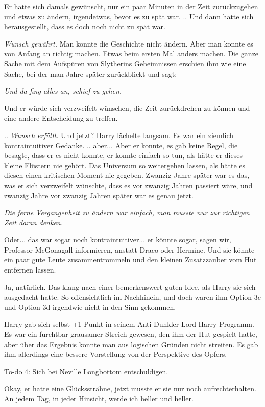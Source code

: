 Er hatte sich damals gewünscht, nur ein paar Minuten in der Zeit zurückzugehen
und etwas zu ändern, irgendetwas, bevor es zu spät war. .. Und dann hatte sich
herausgestellt, dass es doch noch nicht zu spät war.

\emph{Wunsch gewährt.} Man konnte die Geschichte nicht ändern. Aber man konnte
es von Anfang an richtig machen. Etwas beim ersten Mal anders machen. Die ganze
Sache mit dem Aufspüren von Slytherins Geheimnissen erschien ihm wie eine Sache,
bei der man Jahre später zurückblickt und sagt:

\emph{Und da fing alles an, schief zu gehen.}

Und er würde sich verzweifelt wünschen, die Zeit zurückdrehen zu können und eine
andere Entscheidung zu treffen.

.. \emph{Wunsch erfüllt.} Und jetzt? Harry lächelte langsam. Es war ein ziemlich
kontraintuitiver Gedanke. .. aber... Aber er konnte, es gab keine Regel, die
besagte, dass er es nicht konnte, er konnte einfach so tun, als hätte er dieses
kleine Flüstern nie gehört. Das Universum so weitergehen lassen, als hätte es
diesen einen kritischen Moment nie gegeben. Zwanzig Jahre später war es das, was
er sich verzweifelt wünschte, dass es vor zwanzig Jahren passiert wäre, und
zwanzig Jahre vor zwanzig Jahren später war es genau jetzt.

\emph{Die ferne Vergangenheit zu ändern war einfach, man musste nur zur
richtigen Zeit daran denken. }

Oder... das war sogar noch kontraintuitiver... er könnte sogar, sagen wir,
Professor McGonagall informieren, anstatt Draco oder Hermine. Und sie könnte ein
paar gute Leute zusammentrommeln und den kleinen Zusatzzauber vom Hut entfernen
lassen.

Ja, natürlich. Das klang nach einer bemerkenswert guten Idee, als Harry sie sich
ausgedacht hatte. So offensichtlich im Nachhinein, und doch waren ihm Option 3c
und Option 3d irgendwie nicht in den Sinn gekommen.

Harry gab sich selbst +1 Punkt in seinem Anti-Dunkler-Lord-Harry-Programm. Es
war ein furchtbar grausamer Streich gewesen, den ihm der Hut gespielt hatte,
aber über das Ergebnis konnte man aus logischen Gründen nicht streiten. Es gab
ihm allerdings eine bessere Vorstellung von der Perspektive des Opfers.

\underline{To-do 4:} Sich bei Neville Longbottom entschuldigen.

Okay, er hatte eine Glückssträhne, jetzt musste er sie nur noch
aufrechterhalten. An jedem Tag, in jeder Hinsicht, werde ich heller und heller.

